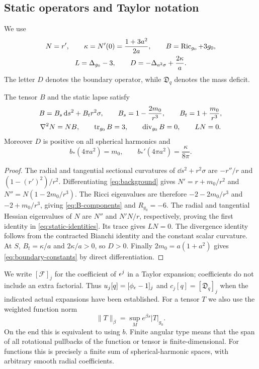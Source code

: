 \subsection{Static operators and Taylor notation}\label{sec:taylor}

We use
\begin{equation}\label{eq:static-operators}
 \begin{gathered}
 N=r',\qquad
 \kappa=N'(0)=\frac{1+3a^2}{2a},\qquad
 B=\operatorname{Ric}_{g_0}+3g_0,\\
 L=\Delta_{g_0}-3,\qquad
 D=-\Delta_{a^2\sigma}+\frac{2\kappa}{a}.
 \end{gathered}
\end{equation}
The letter $D$ denotes the boundary operator, while
$\mathfrak D_q$ denotes the mass deficit.

\begin{lemma}\label{lem:static}
The tensor $B$ and the static lapse satisfy
\begin{gather}
 B=B_s\,\mathrm{d} s^2+B_t r^2\sigma,\qquad
 B_s=1-\frac{2m_0}{r^3},\qquad
 B_t=1+\frac{m_0}{r^3},\label{eq:B-components}\\
 \nabla^2N=NB,\qquad
 \operatorname{tr}_{g_0}B=3,\qquad \operatorname{div}_{g_0}B=0,\qquad
 LN=0.\label{eq:static-identities}
\end{gather}
Moreover $D$ is positive on all spherical harmonics and
\begin{equation}\label{eq:boundary-constants}
 b_*(4\pi a^2)=m_0,\qquad
 b_*'(4\pi a^2)=\frac{\kappa}{8\pi}.
\end{equation}
\end{lemma}

\begin{proof}
The radial and tangential sectional curvatures of
$\dd s^2+r^2\sigma$ are $-r''/r$ and $(1-(r')^2)/r^2$.
Differentiating \eqref{eq:background} gives
$N'=r+m_0/r^2$ and $N''=N(1-2m_0/r^3)$.
The Ricci eigenvalues are therefore $-2-2m_0/r^3$ and
$-2+m_0/r^3$, giving \eqref{eq:B-components} and $R_{g_0}=-6$.
The radial and tangential Hessian eigenvalues of $N$ are
$N''$ and $N'N/r$, respectively, proving the first identity
in \eqref{eq:static-identities}. Its trace gives $LN=0$.
The divergence identity follows from the contracted Bianchi
identity and the constant scalar curvature.
At $S$, $B_t=\kappa/a$ and $2\kappa/a>0$, so $D>0$.
Finally $2m_0=a(1+a^2)$ gives \eqref{eq:boundary-constants}
by direct differentiation.
\end{proof}

We write $[\mathcal F]_j$ for the coefficient of $\epsilon^j$ in a
Taylor expansion; coefficients do not include an extra factorial.
Thus $u_j[q]=[\phi_\epsilon-1]_j$ and $c_j[q]=[\mathfrak D_q]_j$
when the indicated actual expansions have been established.
For a tensor $T$ we also use the weighted function norm
\[
 \|T\|_\beta=\sup_M e^{\beta s}|T|_{g_0}.
\]
On the end this is equivalent to using $b$.
Finite angular type means that the span of all rotational
pullbacks of the function or tensor is finite-dimensional.
For functions this is precisely a finite sum of spherical-harmonic
spaces, with arbitrary smooth radial coefficients.


